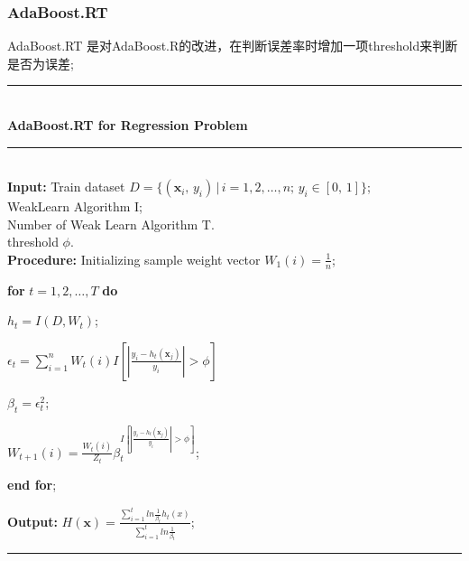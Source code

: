 \documentclass[a4paper]{article}
\begin{document}
		\subsubsection{AdaBoost.RT}	
			AdaBoost.RT 是对AdaBoost.R的改进，在判断误差率时增加一项threshold来判断是否为误差;
			\noindent\rule[0.1\baselineskip]{\textwidth}{0.75pt}\\
			\textbf{AdaBoost.RT for Regression Problem}\\
			\noindent\rule[0.1\baselineskip]{\textwidth}{0.5pt}\\
			\textbf{Input:} Train dataset $D = \{(\textbf{x}_i,\,y_i)\,|\,i = 1, 2,\dots, n;\, y_i \in [0,\,1]\}$;\\
			\hspace*{32pt} WeakLearn Algorithm I;\\
			\hspace*{32pt} Number of Weak Learn Algorithm T.\\
			\hspace*{32pt} threshold $\phi$.\\
			\textbf{Procedure:} 
					\hspace*{2pt} Initializing sample weight vector $W_1(i) = \frac{1}{n}$;\par
					\hspace*{32pt} \textbf{for} $t = 1, 2,\dots, T$ \textbf{do}\par
							\hspace*{48pt} $h_t = I(D, W_t)$;\par
							\hspace*{48pt} $\epsilon_t = \sum_{i=1}^{n}W_t(i)I[|\frac{y_i-h_t(\textbf{x}_j)}{y_i}|>\phi]$\par
							\hspace*{48pt} $\beta_t = \epsilon_t^2$;\par
							\hspace*{48pt} $W_{t+1}(i) = \frac{W_{t}(i)}{Z_t}\beta_t^{I[|\frac{y_i-h_t(\textbf{x}_j)}{y_i}|>\phi]}$;\par
					\hspace*{32pt}\textbf{end for};\par
			\textbf{Output:} $H(\textbf{x}) = \frac{\sum_{i=1}^tln\frac{1}{\beta_t}h_t(x)}{\sum_{i=1}^{t}ln\frac{1}{\beta_t}}$;\par
			\noindent\rule[0.1\baselineskip]{\textwidth}{0.75pt}
\end{document}
